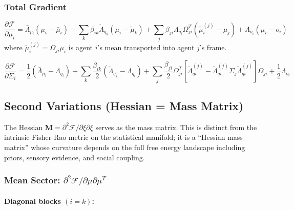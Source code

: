 \documentclass[12pt]{article}
\begin{document}
\subsubsection{Total Gradient}

\begin{equation}
\boxed{
\frac{\partial \mathcal{F}}{\partial \mu_i} = \bar{\Lambda}_{p_i}(\mu_i - \bar{\mu}_i) + \sum_k \beta_{ik}\tilde{\Lambda}_{q_k}(\mu_i - \tilde{\mu}_k) + \sum_j \beta_{ji}\Lambda_{q_i}\Omega_{ji}^T(\tilde{\mu}_i^{(j)} - \mu_j) + \Lambda_{o_i}(\mu_i - o_i)
}
\label{eq:total_gradient_mu}
\end{equation}
%
where $\tilde{\mu}_i^{(j)} = \Omega_{ji}\mu_i$ is agent $i$'s mean transported into agent $j$'s frame.

\begin{equation}
\boxed{
\frac{\partial \mathcal{F}}{\partial \Sigma_i} = \frac{1}{2}(\bar{\Lambda}_{p_i} - \Lambda_{q_i}) + \sum_k \frac{\beta_{ik}}{2}(\tilde{\Lambda}_{q_k} - \Lambda_{q_i}) + \sum_j \frac{\beta_{ji}}{2}\Omega_{ji}^T\left[\tilde{\Lambda}_{qi}^{(j)} - \tilde{\Lambda}_{qi}^{(j)}\Sigma_j\tilde{\Lambda}_{qi}^{(j)}\right]\Omega_{ji} + \frac{1}{2}\Lambda_{o_i}
}
\label{eq:total_gradient_sigma}
\end{equation}

\subsection{Second Variations (Hessian = Mass Matrix)}

The Hessian $\mathbf{M} = \partial^2\mathcal{F}/\partial\xi\partial\xi$ serves as the mass matrix. This is distinct from the intrinsic Fisher-Rao metric on the statistical manifold; it is a ``Hessian mass matrix'' whose curvature depends on the full free energy landscape including priors, sensory evidence, and social coupling.

\subsubsection{Mean Sector: $\partial^2\mathcal{F}/\partial\mu\partial\mu^T$}

\paragraph{Diagonal blocks $(i = k)$:}
\end{document}
